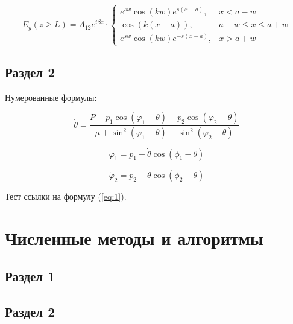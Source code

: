 \documentclass[14pt,oneside]{extarticle}
\begin{document}
\begin{equation}
    E_{y}\left(z\geq L\right)=A_{12}e^{i\beta z}\cdot\begin{cases}
        e^{sw}\cos\left(kw\right)e^{s\left(x-a\right)}, & x<a-w\\
        \cos\left(k\left(x-a\right)\right), & a-w\leq x\le a+w\\
        e^{sw}\cos\left(kw\right)e^{-s\left(x-a\right)}, & x>a+w
        \end{cases}    
\end{equation}


\subsection{Раздел 2}

Нумерованные формулы:

\begin{equation}
\label{eq:1}
    \dot{\theta}=\frac{P-p_{1}\cos\left(\varphi_{1}-\theta\right)-p_{2}\cos\left(\varphi_{2}-\theta\right)}{\mu+\sin^{2}\left(\varphi_{1}-\theta\right)+\sin^{2}\left(\varphi_{2}-\theta\right)}
\end{equation}

\begin{equation}
    \dot{\varphi}_{1}=p_{1}-\dot{\theta}\cos(\phi_{1}-\theta)
\end{equation}

\begin{equation}
    \dot{\varphi}_{2}=p_{2}-\dot{\theta}\cos(\phi_{2}-\theta)
\end{equation}

Тест ссылки на формулу (\ref{eq:1}).

\pagebreak
\section{Численные методы и алгоритмы}

\subsection{Раздел 1}

\subsection{Раздел 2}
\end{document}
